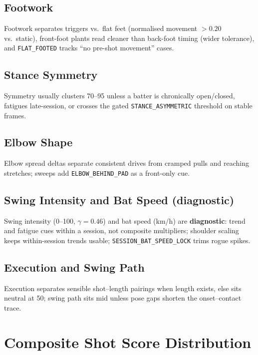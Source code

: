 \begin{justify}
\subsection{Footwork}

\par Footwork separates triggers vs.\ flat feet (normalised movement $> 0.20$ vs.\ static), front-foot plants read cleaner than back-foot timing (wider tolerance), and \texttt{FLAT\_FOOTED} tracks ``no pre-shot movement'' cases.

\subsection{Stance Symmetry}

\par Symmetry usually clusters 70--95 unless a batter is chronically open/closed, fatigues late-session, or crosses the gated \texttt{STANCE\_ASYMMETRIC} threshold on stable frames.

\subsection{Elbow Shape}

\par Elbow spread deltas separate consistent drives from cramped pulls and reaching stretches; sweeps add \texttt{ELBOW\_BEHIND\_PAD} as a front-only cue.

\subsection{Swing Intensity and Bat Speed (diagnostic)}

\par Swing intensity (0--100, $\gamma = 0.46$) and bat speed (km/h) are \textbf{diagnostic}: trend and fatigue cues within a session, not composite multipliers; shoulder scaling keeps within-session trends usable; \texttt{SESSION\_BAT\_SPEED\_LOCK} trims rogue spikes.

\subsection{Execution and Swing Path}

\par Execution separates sensible shot--length pairings when length exists, else sits neutral at 50; swing path sits mid unless pose gaps shorten the onset--contact trace.

\section{Composite Shot Score Distribution}


\end{justify}
